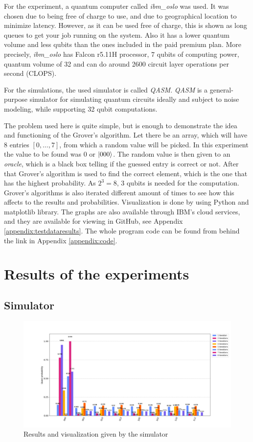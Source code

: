 \documentclass[english,oneside,openright]{UH_DS_report}
\begin{document}
For the experiment, a quantum computer called \emph{ibm\_oslo} was used. It was chosen due to being free of charge to use, and due to geographical location to minimize latency. However, as it can be used free of charge, this is shown as long queues to get your job running on the system. Also it has a lower quantum volume and less qubits than the ones included in the paid premium plan. More precisely, \emph{ibm\_oslo} has Falcon r5.11H processor, $7$ qubits of computing power, quantum volume of 32 and can do around 2600 circuit layer operations per second (CLOPS).

For the simulations, the used simulator is called \emph{QASM}. \emph{QASM} is a general-purpose simulator for simulating quantum circuits ideally and subject to noise modeling, while supporting 32 qubit computations.

The problem used here is quite simple, but is enough to demonstrate the idea and functioning of the Grover's algorithm. Let there be an array, which will have 8 entries $[0, \ldots, 7]$, from which a random value will be picked. In this experiment the value to be found was $0$ or $\ket{000}$. The random value is then given to an \emph{oracle}, which is a black box telling if the guessed entry is correct or not. After that Grover's algorithm is used to find the correct element, which is the one that has the highest probability. As $2^{3}=8$, $3$ qubits is needed for the computation. Grover's algorithms is also iterated different amount of times to see how this affects to the results and probabilities. Visualization is done by using Python and matplotlib library. The graphs are also available through IBM's cloud services, and they are available for viewing in GitHub, see Appendix \ref{appendix:testdataresults}. The whole program code can be found from behind the link in Appendix \ref{appendix:code}.

\section{Results of the experiments}
\label{Allresults}

\subsection{Simulator}
\label{simulator}
\begin{figure}[h]
\caption{Results and visualization given by the simulator}
\centering
\includegraphics[width=\linewidth]{images/simulator/Figure_1.png}
\end{figure}
\end{document}

